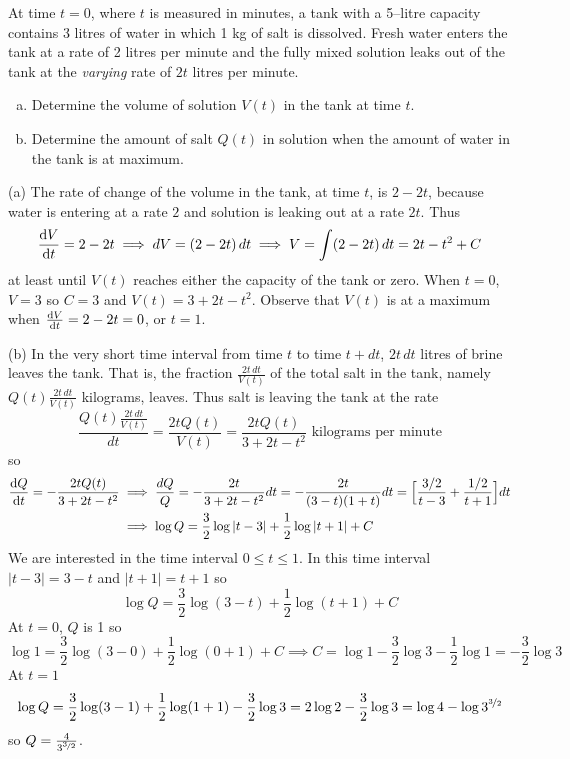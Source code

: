 \begin{eg}\label{eg:SDEmixingA}
At time $t=0$, where $t$ is measured in minutes, a tank with
a 5--litre capacity contains 3 litres of water in which 1 kg of salt
is dissolved. Fresh water enters the tank at a rate of 2 litres per
minute and the fully mixed solution leaks out of the tank at the
\emph{varying} rate of $2t$ litres per minute.
\begin{enumerate}[(a)]
\item Determine the volume of solution $V(t)$ in the tank at time
$t$.
\item Determine the amount of salt $Q(t)$ in solution when the
amount of water in the tank is at maximum.
\end{enumerate}

\soln (a) The rate of change of the volume in the tank, at time $t$,
is $2-2t$, because water is entering at a rate $2$ and solution is
leaking out at a rate $2t$. Thus
\begin{equation*}
\diff{V}{t}=2-2t
\implies dV=(2-2t)\,dt
\implies V=\int (2-2t)\,dt
=2t-t^2+C
\end{equation*}
at least until $V(t)$ reaches either the capacity of the tank or zero.
When $t=0$, $V=3$ so $C=3$ and $V(t)=3+2t-t^2$. Observe that
$V(t)$ is at a maximum when $\diff{V}{t}=2-2t=0$, or $t=1$.

\medskip
\noindent (b) In the very short time interval from time $t$ to time $t+dt$,
 $2t\,dt$ litres of brine leaves the tank. That is, the fraction
$\frac{2t\,dt}{V(t)}$ of the total salt in the tank,
namely $Q(t)\frac{2t\,dt}{V(t)}$ kilograms, leaves. Thus salt is leaving the
tank at the rate
\begin{equation*}
\frac{Q(t)\frac{2t\,dt}{V(t)}}{dt}
=\frac{2tQ(t)}{V(t)}
=\frac{2tQ(t)}{3+2t-t^2} \text{ kilograms per minute}
\end{equation*}
so
\begin{align*}
\diff{Q}{t}=-\frac{2tQ(t)}{3+2t-t^2}
&\implies
\frac{dQ}{Q}=-\frac{2t}{3+2t-t^2}dt=-\frac{2t}{(3-t)(1+t)}dt
=\Big[\frac{3/2}{t-3}+\frac{1/2}{t+1}\Big]dt\\
&\implies
\log Q=\frac{3}{2}\log|t-3|+\frac{1}{2}\log|t+1|+C
\end{align*}
We are interested in the time interval $0\le t\le 1$. In this time interval
$|t-3|=3-t$ and $|t+1|=t+1$ so
\begin{equation*}
\log Q=\frac{3}{2}\log(3-t)+\frac{1}{2}\log(t+1)+C
\end{equation*}
At $t=0$, $Q$ is 1 so
\begin{equation*}
\log 1=\frac{3}{2}\log(3-0)+\frac{1}{2}\log(0+1)+C
\implies
C=\log 1-\frac{3}{2}\log 3-\frac{1}{2}\log 1=-\frac{3}{2}\log 3
\end{equation*}
At $t=1$
\begin{equation*}
\log Q=\frac{3}{2}\log(3-1)+\frac{1}{2}\log(1+1)-\frac{3}{2}\log 3
=2\log 2-\frac{3}{2}\log 3
=\log 4 -\log 3^{\nicefrac{3}{2}}
\end{equation*}
so $Q=\frac{4}{3^{\nicefrac{3}{2}}}$.
\end{eg}
\goodbreak

